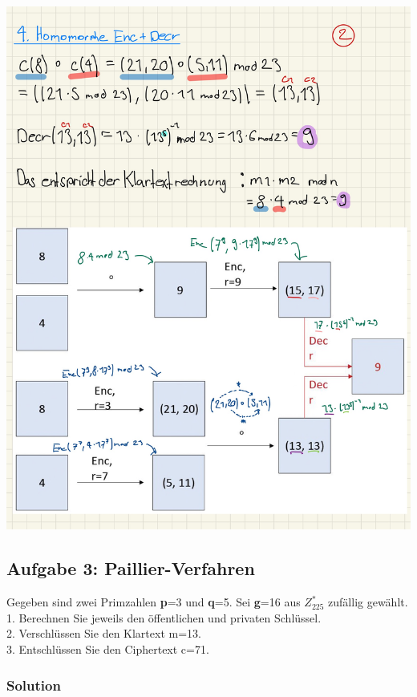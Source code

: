 \documentclass[11pt]{article}
\begin{document}
\begin{center}
	\includegraphics[scale=0.96]{img/helg2.jpg} \\
\end{center}


\newpage

    \hypertarget{aufgabe-3-paillier-verfahren}{%
\subsection{Aufgabe 3:
Paillier-Verfahren}\label{aufgabe-3-paillier-verfahren}}

Gegeben sind zwei Primzahlen \textbf{p}=3 und \textbf{q}=5. Sei
\textbf{g}=16 aus \(Z^{*}_{225}\) zufällig gewählt. \\
1. Berechnen Sie
jeweils den öffentlichen und privaten Schlüssel. \\
2. Verschlüssen Sie den
Klartext m=13. \\
3. Entschlüssen Sie den Ciphertext c=71.

\hypertarget{solution}{%
\subsubsection{Solution}\label{solution}}
\end{document}
